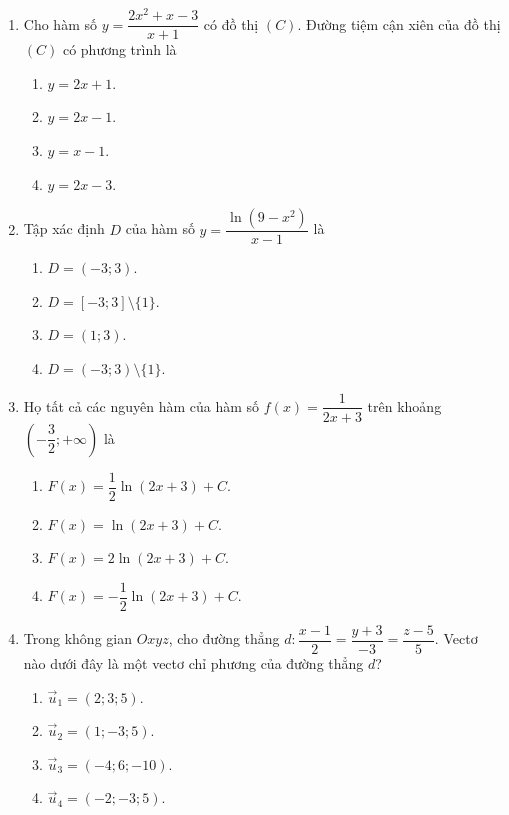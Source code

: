 \documentclass[12pt,a4paper]{article}
\begin{document}
\begin{enumerate}[label=\textbf{Câu \arabic*:}, leftmargin=*]

\item Cho hàm số $y = \dfrac{2x^2 + x - 3}{x + 1}$ có đồ thị $(C)$. Đường tiệm cận xiên của đồ thị $(C)$ có phương trình là
\begin{enumerate}[label=\Alph*.]
    \item $y = 2x + 1$.
    \item $y = 2x - 1$.
    \item $y = x - 1$.
    \item $y = 2x - 3$.
\end{enumerate}

\item Tập xác định $D$ của hàm số $y = \dfrac{\ln(9 - x^2)}{x - 1}$ là
\begin{enumerate}[label=\Alph*.]
    \item $D = (-3; 3)$.
    \item $D = [-3; 3] \setminus \{1\}$.
    \item $D = (1; 3)$.
    \item $D = (-3; 3) \setminus \{1\}$.
\end{enumerate}

\item Họ tất cả các nguyên hàm của hàm số $f(x) = \dfrac{1}{2x + 3}$ trên khoảng $\left(-\dfrac{3}{2}; +\infty\right)$ là
\begin{enumerate}[label=\Alph*.]
    \item $F(x) = \dfrac{1}{2}\ln(2x + 3) + C$.
    \item $F(x) = \ln(2x + 3) + C$.
    \item $F(x) = 2\ln(2x + 3) + C$.
    \item $F(x) = -\dfrac{1}{2}\ln(2x + 3) + C$.
\end{enumerate}

\item Trong không gian $Oxyz$, cho đường thẳng $d: \dfrac{x - 1}{2} = \dfrac{y + 3}{-3} = \dfrac{z - 5}{5}$. Vectơ nào dưới đây là một vectơ chỉ phương của đường thẳng $d$?
\begin{enumerate}[label=\Alph*.]
    \item $\vec{u}_1 = (2; 3; 5)$.
    \item $\vec{u}_2 = (1; -3; 5)$.
    \item $\vec{u}_3 = (-4; 6; -10)$.
    \item $\vec{u}_4 = (-2; -3; 5)$.
\end{enumerate}


\end{enumerate}
\end{document}
